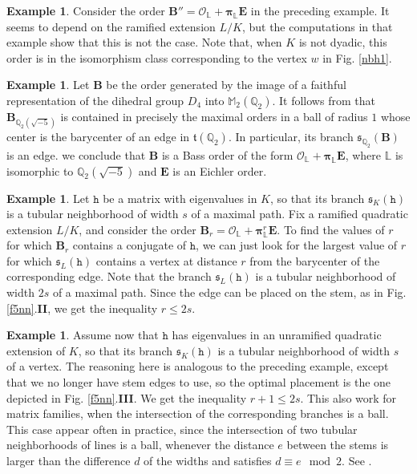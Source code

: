 \documentclass{amsart}
\theoremstyle{definition}
\newtheorem{example}[theorem]{Example}
\newcommand\lu{\mathbb{L}}
\newcommand\Ba{\mathbf B}
\newcommand\Ea{\mathbf{E}}
\begin{document}
\begin{example}\label{e64}
    Consider the order  $\Ba''=\mathcal{O}_{\lu}+
    \boldsymbol\pi_{\lu}\Ea$ in the preceding example. It seems to 
    depend on the ramified extension
    $L/K$, but the computations in
    that example show that
    this is not the case. Note that,
    when $K$ is not dyadic, this order
    is in the isomorphism class corresponding to the vertex $w$
    in Fig. \ref{nbh1}.
\end{example}

\begin{example}
    Let $\Ba$ be the order generated
    by the image of a faithful representation
    of the dihedral group $D_4$ into
    $\mathbb{M}_2(\mathbb{Q}_2)$. 
    It follows from \cite[Ex. 9.1]{AAS}
    that $\Ba_{\mathbb{Q}_2(\sqrt{-5})}$ is 
    contained in precisely
    the maximal orders in a ball of
    radius $1$ whose
    center is the barycenter of an edge
    in $\mathfrak{t}(\mathbb{Q}_2)$.
    In particular, its branch 
    $\mathfrak{s}_{\mathbb{Q}_2}(\Ba)$
    is an edge.
    we conclude that $\Ba$ is a Bass order
    of the form 
    $\mathcal{O}_{\lu}+\boldsymbol\pi_{\lu}\Ea$, 
    where $\lu$ is isomorphic
    to $\mathbb{Q}_2(\sqrt{-5})$ and
    $\Ea$ is an Eichler order.
\end{example}


\begin{example}\label{e66}
    Let $\mathtt{h}$ be a matrix with
    eigenvalues in $K$, so that its
    branch $\mathfrak{s}_K(\mathtt{h})$
    is a tubular neighborhood of width $s$
    of a maximal path. Fix a ramified quadratic extension $L/K$, and 
    consider the order $\Ba_r=
    \mathcal{O}_{\lu}+
    \boldsymbol\pi_{\lu}^r\Ea$. To find the
    values of $r$ for which $\Ba_r$
    contains a conjugate of $\mathtt{h}$,
    we can just look for the largest
    value of $r$ for which
    $\mathfrak{s}_L(\mathtt{h})$
    contains a vertex at distance $r$
    from the barycenter of the corresponding edge.
    Note that the branch $\mathfrak{s}_L(\mathtt{h})$
    is a tubular neighborhood of width $2s$ of a maximal path.
    Since the edge can be placed
    on the stem, as in Fig. \ref{f5nn}.\textbf{II}, we get
    the inequality $r\leq2s$.
\end{example}

\begin{example}\label{e67}
    Assume now that $\mathtt{h}$ has eigenvalues in an 
    unramified quadratic extension of $K$, so that its
    branch $\mathfrak{s}_K(\mathtt{h})$
    is a tubular neighborhood of width $s$
    of a vertex. The reasoning here is
    analogous to the preceding example,
    except that we no longer have stem
    edges to use, so the optimal placement is the 
    one depicted in Fig. \ref{f5nn}.\textbf{III}.
    We get the inequality $r+1\leq2s$. 
    This also work for matrix families,
    when the intersection of the corresponding
    branches is a ball. This case appear often
    in practice, since the intersection
    of two tubular neighborhoods of lines
    is a ball, whenever the distance $e$ between
    the stems is larger than the difference $d$
    of the widths and satisfies $d\equiv e\mod 2$.
    See \cite[Prop. 2.3]{AS16}.
\end{example}
\end{document}
